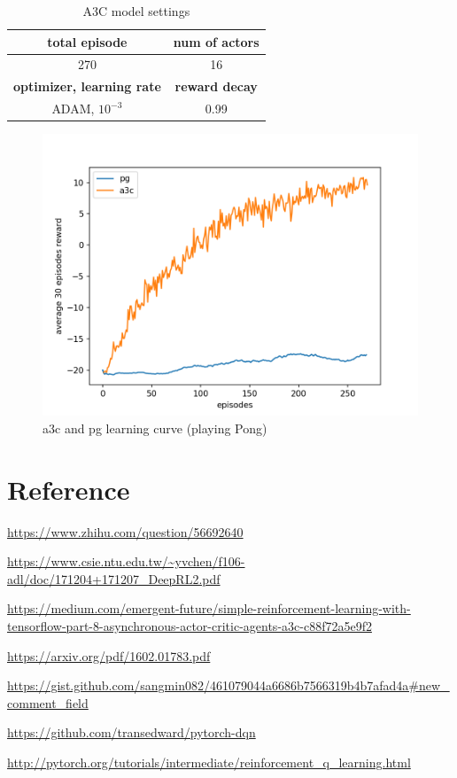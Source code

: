 \documentclass[12pt, a4paper]{article}
\begin{document}
\begin{CJK}{UTF8}{bkai}
\begin{table}[!htb]
\centering
\begin{tabular}{|c|c|}
\hline
{\textbf{total episode}} & {\textbf{num of actors}}\\
\hline
{270} & {16}\\
\hline
\hline
{\textbf{optimizer, learning rate}} & {\textbf{reward decay}} \\
\hline
{ADAM, $10^{-3}$} & {0.99}\\
\hline

\end{tabular} 
\caption{A3C model settings}
\label{table:3}
\end{table}

\begin{figure}[!htb]
\centering
\includegraphics[scale=0.7]{pg_vs_a3c_avg_reward.png}
\caption{a3c and pg learning curve (playing Pong)}
\label{fig:f11}
\end{figure}

\section{Reference}
\noindent

\url{https://www.zhihu.com/question/56692640}\par
\url{https://www.csie.ntu.edu.tw/~yvchen/f106-adl/doc/171204+171207_DeepRL2.pdf}\par
\url{https://medium.com/emergent-future/simple-reinforcement-learning-with-tensorflow-part-8-asynchronous-actor-critic-agents-a3c-c88f72a5e9f2}\par
\url{https://arxiv.org/pdf/1602.01783.pdf}\par
\url{https://gist.github.com/sangmin082/461079044a6686b7566319b4b7afad4a#new_comment_field}\par
\url{https://github.com/transedward/pytorch-dqn}\par
\url{http://pytorch.org/tutorials/intermediate/reinforcement_q_learning.html}\par
\end{CJK}
\end{document}
